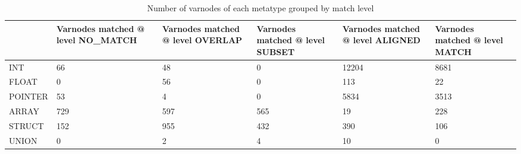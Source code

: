 \begin{table}[t]
\centering
\caption{Number of varnodes of each metatype grouped by match level}
\label{table:metatype-match-levels}
\begin{tabular}{lp{3.6cm}p{3.6cm}p{3.6cm}p{3.6cm}p{3.6cm}}
\toprule
{} &  Varnodes matched @ level NO\_MATCH &  Varnodes matched @ level OVERLAP &  Varnodes matched @ level SUBSET &  Varnodes matched @ level ALIGNED &  Varnodes matched @ level MATCH \\
\midrule
INT     &                                 66 &                                48 &                                0 &                             12204 &                            8681 \\
FLOAT   &                                  0 &                                56 &                                0 &                               113 &                              22 \\
POINTER &                                 53 &                                 4 &                                0 &                              5834 &                            3513 \\
ARRAY   &                                729 &                               597 &                              565 &                                19 &                             228 \\
STRUCT  &                                152 &                               955 &                              432 &                               390 &                             106 \\
UNION   &                                  0 &                                 2 &                                4 &                                10 &                               0 \\
\bottomrule
\end{tabular}
\end{table}
